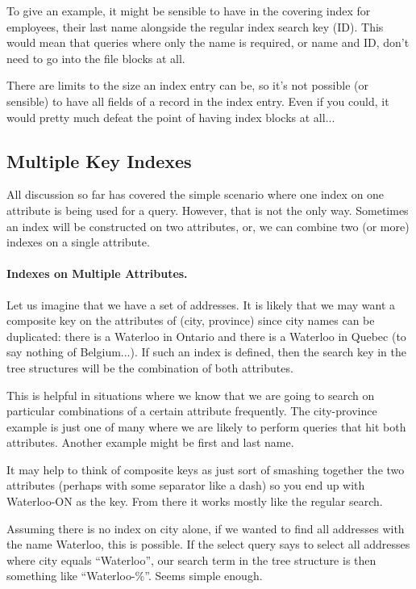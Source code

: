 To give an example, it might be sensible to have in the covering index for employees, their last name alongside the regular index search key (ID). This would mean that queries where only the name is required, or name and ID, don't need to go into the file blocks at all.

There are limits to the size an index entry can be, so it's not possible (or sensible) to have all fields of a record in the index entry. Even if you could, it would pretty much defeat the point of having index blocks at all...

\subsection*{Multiple Key Indexes}

All discussion so far has covered the simple scenario where one index on one attribute is being used for a query. However, that is not the only way. Sometimes an index will be constructed on two attributes, or, we can combine two (or more) indexes on a single attribute. 

\paragraph{Indexes on Multiple Attributes.} Let us imagine that we have a set of addresses. It is likely that we may want a composite key on the attributes of (city, province) since city names can be duplicated: there is a Waterloo in Ontario and there is a Waterloo in Quebec (to say nothing of Belgium...). If such an index is defined, then the search key in the tree structures will be the combination of both attributes. 

This is helpful in situations where we know that we are going to search on particular combinations of a certain attribute frequently. The city-province example is just one of many where we are likely to perform queries that hit both attributes. Another example might be first and last name.

It may help to think of composite keys as just sort of smashing together the two attributes (perhaps with some separator like a dash) so you end up with Waterloo-ON as the key. From there it works mostly like the regular search. 

Assuming there is no index on city alone, if we wanted to find all addresses with the name Waterloo, this is possible. If the select query says to select all addresses where city equals ``Waterloo'', our search term in the tree structure is then something like ``Waterloo-\%''. Seems simple enough. 


